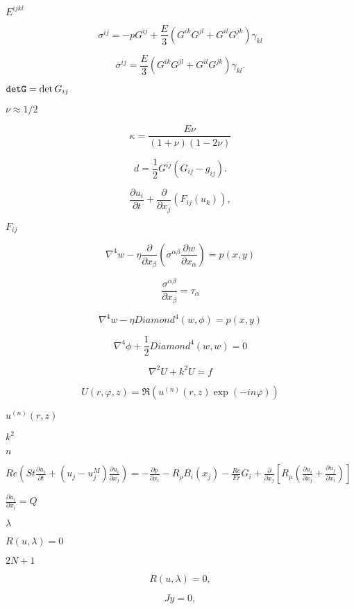 \documentclass{article}
\begin{document}
$ E^{ijkl} $
\pagebreak

\[ \sigma^{ij} = -p G^{ij} + \frac{E}{3} \left( G^{ik} G^{jl} + G^{il} G^{jk} \right) \gamma_{kl} \]
\pagebreak

\[ \overline{\sigma}^{ij} = \frac{E}{3} \left( G^{ik} G^{jl} + G^{il} G^{jk} \right) \gamma_{kl}. \]
\pagebreak

$ {\tt detG} = \det G_{ij} $
\pagebreak

$ \nu \approx 1/2 $
\pagebreak

\[ \kappa = \frac{E\nu}{(1+\nu)(1-2\nu)} \]
\pagebreak

\[ d = \frac{1}{2} G^{ij} (G_{ij}-g_{ij}). \]
\pagebreak

\[ \frac{\partial u_{i}}{\partial t} + \frac{\partial}{\partial x_{j}} \left(F_{ij}(u_{k})\right), \]
\pagebreak

$ F_{ij} $
\pagebreak

\[ \nabla^4 w - \eta \frac{\partial}{\partial x_{\beta}} \left( \sigma^{\alpha \beta} \frac{\partial w}{\partial x_{\alpha}} \right) = p(x,y) \]
\pagebreak

\[ \frac{\sigma^{\alpha \beta}}{\partial x_{\beta}} = \tau_\alpha \]
\pagebreak

\[ \nabla^4 w - \eta Diamond^4(w,\phi) = p(x,y) \]
\pagebreak

\[ \nabla^4 \phi + \frac{1}{2} Diamond^4(w,w) = 0 \]
\pagebreak

\[ \nabla^2 U + k^2 U = f \]
\pagebreak

\[ U(r,\varphi,z) = \Re( u^{(n)}(r,z) \exp(-i n \varphi)) \]
\pagebreak

$ u^{(n)}(r,z)$
\pagebreak

$ k^2 $
\pagebreak

$ n $
\pagebreak

$ { Re \left( St \frac{\partial u_i}{\partial t} + (u_j - u_j^{M}) \frac{\partial u_i}{\partial x_j} \right) = - \frac{\partial p}{\partial x_i} - R_\rho B_i(x_j) - \frac{Re}{Fr} G_i + \frac{\partial }{\partial x_j} \left[ R_\mu \left( \frac{\partial u_i}{\partial x_j} + \frac{\partial u_j}{\partial x_i} \right) \right] } $
\pagebreak

$ { \frac{\partial u_i}{\partial x_i} = Q } $
\pagebreak

$\lambda$
\pagebreak

$R(u,\lambda) = 0 $
\pagebreak

$ 2N+1 $
\pagebreak

\[ R(u,\lambda) = 0, \]
\pagebreak

\[ Jy = 0, \]
\pagebreak
\end{document}
